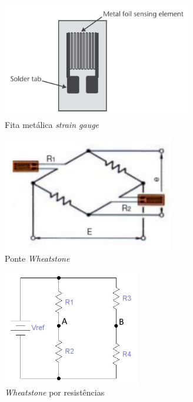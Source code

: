 \begin{minipage}[!b]{.5\linewidth}
\begin{figure}[H]
	\captionsetup{justification=raggedright,singlelinecheck=false}
	\flushleft
	\includegraphics[height=5cm]{./image/PESTA/general/strain_gauge_1.jpg}
	\caption{Fita metálica \textit{strain gauge} \cite{book-9}}
	\label{strain_gauge_1}
\end{figure}
\end{minipage}
\begin{minipage}[!b]{.5\linewidth}
\begin{figure}[H]
	\captionsetup{justification=raggedright,singlelinecheck=false}
	\flushleft
	\includegraphics[height=5cm]{./image/PESTA/schematic/Wheatstone_2.jpg}
	\qquad \caption{Ponte \textit{Wheatstone}}
	\label{wheatstone_2}
\end{figure}
\end{minipage}
\begin{minipage}[!b]{.4\linewidth}
	\begin{figure}[H]
		\captionsetup{justification=raggedright,singlelinecheck=false}
		\flushleft
		\includegraphics[height=5cm]{./image/PESTA/schematic/Wheatstone_1.jpg}
		\caption{\textit{Wheatstone} por resistências}
		\label{wheatstone_1}
	\end{figure}
\end{minipage}
